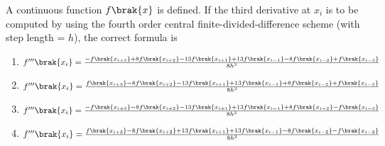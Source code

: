 \iffalse
\chapter{2020}
\author{AI24BTECH11014}
\section{ce}
\fi

\item A continuous function $f\brak{x}$ is defined. If the third derivative at $x_{i}$ is to be computed by using the fourth order central finite-divided-difference scheme (with step length = $h$), the correct formula is 
\begin{enumerate}
\item $f''' \brak{x_{i}} = \frac{-f\brak{x_{i+3}} + 8 f\brak{x_{i+ 2}} -13 f \brak{x_{i+ 1}} + 13f\brak{x_{i-1}} - 8 f\brak{x_{i-2}} + f\brak{x_{i - 3}}}{8 h ^{3}}$
\item $f''' \brak{x_{i}} = \frac{f\brak{x_{i+3}} - 8 f\brak{x_{i+ 2}} -13 f \brak{x_{i+ 1}} + 13f\brak{x_{i-1}} + 8 f\brak{x_{i-2}} + f\brak{x_{i - 3}}}{8 h ^{3}}$
\item $f''' \brak{x_{i}} = \frac{-f\brak{x_{i+3}} - 8 f\brak{x_{i+ 2}} -13 f \brak{x_{i+ 1}} + 13f\brak{x_{i-1}} + 8 f\brak{x_{i-2}} - f\brak{x_{i - 3}}}{8 h ^{3}}$
\item $f''' \brak{x_{i}} = \frac{f\brak{x_{i+3}} - 8 f\brak{x_{i+ 2}} + 13 f \brak{x_{i+ 1}} + 13f\brak{x_{i-1}} - 8 f\brak{x_{i-2}} - f\brak{x_{i - 3}}}{8 h ^{3}}$
\end{enumerate}

